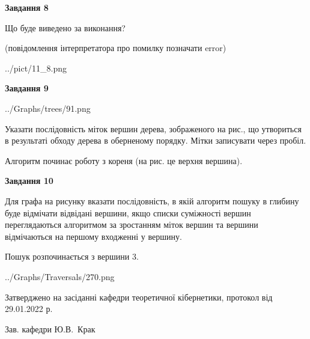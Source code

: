 \documentclass[12pt, ukrainian]{article}
\begin{document}
{\begin {large}
{\begin {center}\textbf{Завдання 8}\end {center}}\par
Що буде виведено за виконання?\par
 (повідомлення інтерпретатора про помилку позначати error)\par
\begin{center}
	{../pict/11_8.png}
\end{center}
\newpage

{\begin {center}\textbf{Завдання 9}\end {center}}\par

\begin{center}
	{../Graphs/trees/91.png}
\end{center}
Указати послідовність міток вершин дерева, зображеного на рис., що утвориться в результаті обходу дерева в оберненому порядку. Мітки записувати через пробіл.\par Алгоритм починає роботу з кореня (на рис. це верхня вершина).\par
\newpage

{\begin {center}\textbf{Завдання 10}\end {center}}\par
Для графа на рисунку вказати послідовність, в якій алгоритм пошуку в глибину буде відмічати відвідані вершини, якщо списки суміжності вершин переглядаються алгоритмом за зростанням міток вершин та вершини відмічаються на першому вход\-женні у вершину.\par
Пошук розпочинається з вершини 3.\par

\begin{center}
	{../Graphs/Traversals/270.png}
\end{center}\par
\newpage


\end {large}
}
{\smallskip \begin {small} Затверджено на засіданні кафедри теоретичної кібернетики, протокол  від   29.01.2022 р.\par\smallskip\smallskip
{\parbox {6.5 cm}{Зав. кафедри \dotfill Ю.В.~Крак}} \end{small}}
\end{document}

